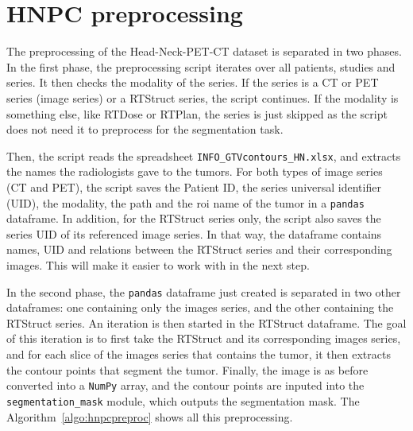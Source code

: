 \newpage
\section{HNPC preprocessing}
The preprocessing of the Head-Neck-PET-CT dataset is separated in two phases. In the first phase, the preprocessing script iterates over all patients, studies and series. It then checks the modality of the series. If the series is a CT or PET series (image series) or a RTStruct series, the script continues. If the modality is something else, like RTDose or RTPlan, the series is just skipped as the script does not need it to preprocess for the segmentation task.

Then, the script reads the spreadsheet \texttt{INFO\_GTVcontours\_HN.xlsx}, and extracts the names the radiologists gave to the tumors. For both types of image series (CT and PET), the script saves the Patient ID, the series universal identifier (UID), the modality, the path and the roi name of the tumor in a \texttt{pandas}~\cite{the_pandas_development_team_pandas-devpandas_2020, mckinney_data_2010} dataframe. In addition, for the RTStruct series only, the script also saves the series UID of its referenced image series. In that way, the dataframe contains names, UID and relations between the RTStruct series and their corresponding images. This will make it easier to work with in the next step.

In the second phase, the \texttt{pandas} dataframe just created is separated in two other dataframes: one containing only the images series, and the other containing the \mbox{RTStruct} series. An iteration is then started in the RTStruct dataframe. The goal of this iteration is to first take the RTStruct and its corresponding images series, and for each slice of the images series that contains the tumor, it then extracts the contour points that segment the tumor. Finally, the image is as before converted into a \texttt{NumPy} array, and the contour points are inputed into the \texttt{segmentation\_mask} module, which outputs the segmentation mask. The Algorithm~\ref{algo:hnpcpreproc} shows all this preprocessing.

